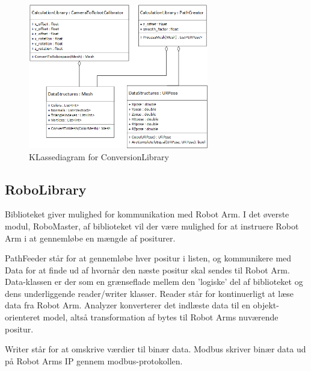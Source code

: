 \begin{figure}[H]
    \centering
    \includegraphics[width=0.7\textwidth]{figurer/d/Design/Class/uml_class_conversionlibrary}
    \caption{KLassediagram for ConversionLibrary}
    \label{class_ConversionLib}
\end{figure}
\newpage

\subsection{RoboLibrary}
Biblioteket giver mulighed for kommunikation med Robot Arm.
I det øverste modul, RoboMaster, af biblioteket vil der være mulighed for at instruere Robot Arm i at gennemløbe en mængde af positurer.

PathFeeder står for at gennemløbe hver positur i listen, og kommunikere med Data for at finde ud af hvornår den næste positur skal sendes til Robot Arm.
Data-klassen er der som en grænseflade mellem den 'logiske' del af biblioteket og dens underliggende reader/writer klasser. Reader står for kontinuerligt at læse data fra Robot Arm. Analyzer konverterer det indlæste data til en objekt-orienteret model, altså transformation af bytes til Robot Arms nuværende positur.

Writer står for at omskrive værdier til binær data. Modbus skriver binær data ud på Robot Arms IP gennem modbus-protokollen.


